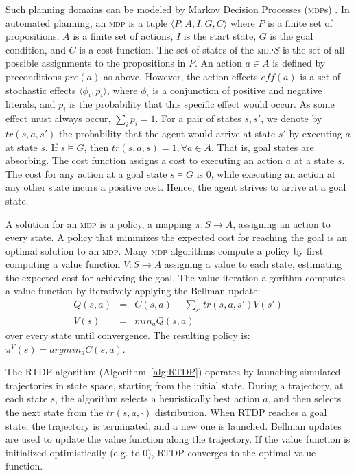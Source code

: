\documentclass[letterpaper]{article} %
\newcommand{\mdps}{\textsc {mdp}s\xspace}
\newcommand{\mdp}{\textsc {mdp}\xspace}
\theoremstyle{remark}
\begin{document}
Such planning domains can be modeled by Markov Decision Processes (\mdps) \cite{kolobov2012planning}. In automated planning, an \mdp is a tuple $\langle P,A,I,G,C \rangle$ where $P$ is a finite set of propositions, $A$ is a finite set of actions, $I$ is the start state, $G$ is the goal condition, and $C$ is a cost function. The set of states of the \mdp $S$ is the set of all possible assignments to the propositions in $P$.
An action $a\in A$ is defined by preconditions $pre(a)$ as above. However, the action effects $\mathit{eff}(a)$ is a set of stochastic effects $\langle \phi_i, p_i \rangle$, where $\phi_i$ is a conjunction of positive and negative literals, and $p_i$ is the probability that this specific effect would occur. As some effect must always occur, $\sum_i p_i = 1$. For a pair of states $s,s'$, we denote by $tr(s,a,s')$ the probability that the agent would arrive at state $s'$ by executing $a$ at state $s$. If $s\models G$, then $tr(s,a,s)=1, \forall a \in A$. That is, goal states are absorbing.
The cost function assigns a cost to executing an action $a$ at a state $s$. The cost for any action at a goal state $s \models G$ is $0$, while executing an action at any other state incurs a positive cost. Hence, the agent strives to arrive at a goal state.

A solution for an \mdp is a policy, a mapping $\pi:S \rightarrow A$, assigning an action to every state. A policy that minimizes the expected cost  for reaching the goal is an optimal solution to an \mdp.
Many \mdp algorithms compute a policy by first computing a value function $V:S \rightarrow A$ assigning a value to each state, estimating the expected cost for achieving the goal.
The value iteration algorithm computes a value function by iteratively applying the Bellman update:
\begin{eqnarray}
Q(s,a) &=& C(s,a)+ \sum_{s'} tr(s,a,s') V(s')\\
V(s) &=& min_a Q(s,a)
\end{eqnarray}
over every state until convergence. The resulting policy is:
$\pi^V(s) = argmin_a C(s,a)$.

The RTDP algorithm (Algorithm~\ref{alg:RTDP}) \cite[e.g.]{kolobov2012planning} operates by launching simulated trajectories in state space, starting from the initial state. During a trajectory, at each state $s$, the algorithm selects a heuristically best action $a$, and then selects the next state from the $tr(s,a,\cdot)$ distribution. When RTDP reaches a goal state, the trajectory is terminated, and a new one is launched. Bellman updates are used to update the value function along the trajectory. If the value function is initialized optimistically (e.g. to 0), RTDP converges to the optimal value function.
\end{document}
